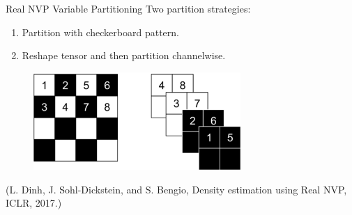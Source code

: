 \begin{frame}[allowframebreaks]

\begin{myconceptblock}{10.29}{Real NVP Variable Partitioning}
    Two partition strategies:

    \begin{enumerate}
        \item Partition with checkerboard pattern.
        \item Reshape tensor and then partition channelwise.
    \end{enumerate}

    \begin{figure}[H]
        \centering
        \includegraphics[width=0.7\textwidth]{.././assets/10.15.png}
    \end{figure}

    (L. Dinh, J. Sohl-Dickstein, and S. Bengio, Density estimation using Real NVP, ICLR, 2017.)
\end{myconceptblock}

\end{frame}

